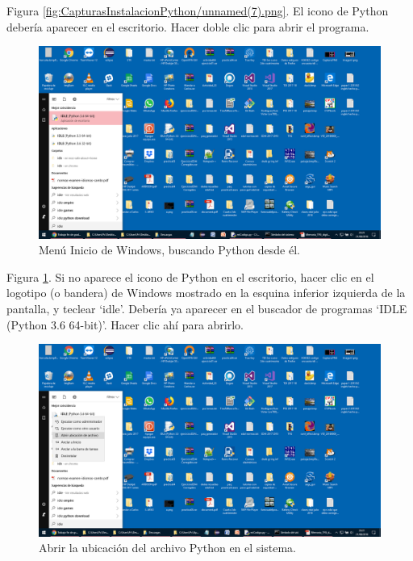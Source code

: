 Figura \ref{fig:CapturasInstalacionPython/unnamed(7).png}. El icono de Python debería aparecer en el escritorio. Hacer doble clic para abrir el programa.\\[20pt]

\begin{figure}[h!]
  	\centering
	\includegraphics[width=\textwidth]{CapturasInstalacionPython/unnamed(8).png}
	\caption{Menú Inicio de Windows, buscando Python desde él.
	\label{fig:CapturasInstalacionPython/unnamed(8).png}}
\end{figure}

Figura \ref{fig:CapturasInstalacionPython/unnamed(8).png}. Si no aparece el icono de Python en el escritorio, hacer clic en el logotipo (o bandera) de Windows mostrado en la esquina inferior izquierda de la pantalla, y teclear ‘idle’. Debería ya aparecer en el buscador de programas ‘IDLE (Python 3.6 64-bit)’. Hacer clic ahí para abrirlo.\\[20pt]

\begin{figure}[h!]
  	\centering
	\includegraphics[width=\textwidth]{CapturasInstalacionPython/unnamed(9).png}
	\caption{Abrir la ubicación del archivo Python en el sistema.
	\label{fig:CapturasInstalacionPython/unnamed(9).png}}
\end{figure}

